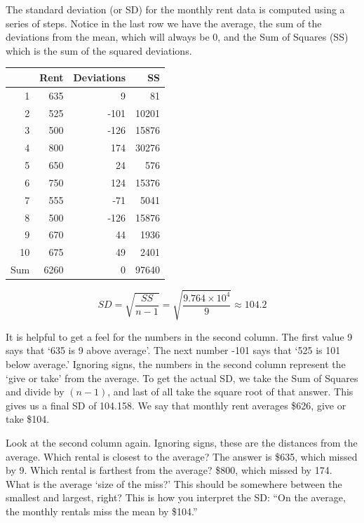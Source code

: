 \documentclass[11pt, chapterprefix=true]{scrbook}\usepackage[]{graphicx}\usepackage[]{color}
\begin{document}
The standard deviation (or SD) for the monthly rent data is computed using a series of steps.  Notice in the last row we have the average, the sum of the deviations from the mean, which will always be 0, and the Sum of Squares (SS) which is the sum of the squared deviations.


\begin{table}[ht]
\centering
\begin{tabular}{rrrr}
  \hline
 & Rent & Deviations & SS \\ 
  \hline
1 & 635 & 9 & 81 \\ 
  2 & 525 & -101 & 10201 \\ 
  3 & 500 & -126 & 15876 \\ 
  4 & 800 & 174 & 30276 \\ 
  5 & 650 & 24 & 576 \\ 
  6 & 750 & 124 & 15376 \\ 
  7 & 555 & -71 & 5041 \\ 
  8 & 500 & -126 & 15876 \\ 
  9 & 670 & 44 & 1936 \\ 
  10 & 675 & 49 & 2401 \\ 
  Sum & 6260 & 0 & 97640 \\ 
   \hline
\end{tabular}
\end{table}


$$ SD = \sqrt{ \frac{ SS}{n - 1}} = \sqrt{ \frac{ \ensuremath{9.764\times 10^{4}}}{9}} \approx 104.2 $$

It is helpful to get a feel for the numbers in the second column.  The first value 9 says that `635 is 9 above average'.  The next number -101 says that `525 is 101 below average.'  Ignoring signs, the numbers in the second column represent the `give or take' from the average.  To get the actual SD, we take the Sum of Squares and divide by $(n - 1)$, and last of all take the square root of that answer.  This gives us a final SD of 104.158.  We say that monthly rent averages \$626, give or take \$104.

Look at the second column again.  Ignoring signs, these are the distances from the average.  Which rental is closest to the average? The answer is \$635, which missed by 9. Which rental is farthest from the average?  \$800, which missed by 174.
What is the average `size of the miss?'  This should be somewhere between the smallest and largest, right?  This is how you interpret the SD: ``On the average, the monthly rentals miss the mean by \$104.''
\end{document}
